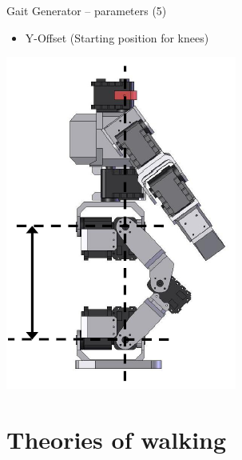 \documentclass[compress]{beamer}
\begin{document}
\begin{frame}{Gait Generator -- parameters (5)}

    \begin{itemize}

        \item Y-Offset (Starting position for knees)
    \end{itemize}
    \begin{center}
        \includegraphics[height=0.5\paperheight]{bioloid-gait-5}
    \end{center}

\end{frame}

\section{Theories of walking}
\end{document}

